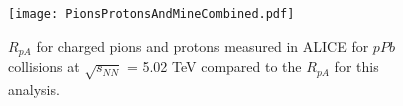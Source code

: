 \begin{figure}[h!]
  \centering
  \texttt{[image: PionsProtonsAndMineCombined.pdf]}\\
  \caption{$R_{pA}$ for charged pions and protons \cite{Adam:2016dau} measured in ALICE for $pPb$ collisions at $\sqrt{s_{NN}}$ = 5.02 TeV compared to the $R_{pA}$ for this analysis.} \label{fig:PionsKaonsProtons}
\end{figure}













